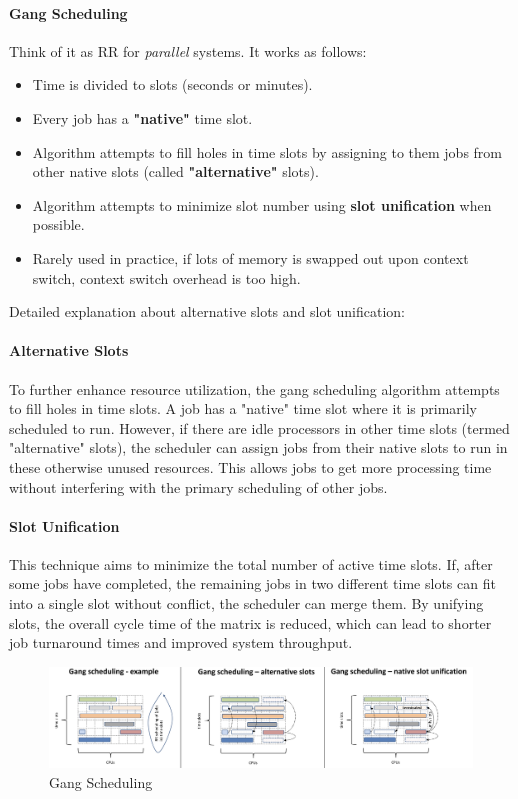 \documentclass[openany,12pt]{book}
\begin{document}
\paragraph{Gang Scheduling} Think of it as RR for \textit{parallel} systems. It works as follows:
\begin{itemize}
  \item Time is divided to slots (seconds or minutes).
  \item Every job has a \textbf{"native"} time slot.
  \item Algorithm attempts to fill holes in time slots by assigning to them jobs from other native slots (called \textbf{"alternative"} slots).
  \item Algorithm attempts to minimize slot number using \textbf{slot unification} when possible.
  \item Rarely used in practice, if lots of memory is swapped out upon context switch, context switch overhead is too high.
\end{itemize}
Detailed explanation about alternative slots and slot unification:

\paragraph{Alternative Slots} To further enhance resource utilization, the gang scheduling algorithm attempts to fill holes in time slots. A job has a "native" time slot where it is primarily scheduled to run. However, if there are idle processors in other time slots (termed "alternative" slots), the scheduler can assign jobs from their native slots to run in these otherwise unused resources. This allows jobs to get more processing time without interfering with the primary scheduling of other jobs.

\paragraph{Slot Unification}This technique aims to minimize the total number of active time slots. If, after some jobs have completed, the remaining jobs in two different time slots can fit into a single slot without conflict, the scheduler can merge them. By unifying slots, the overall cycle time of the matrix is reduced, which can lead to shorter job turnaround times and improved system throughput.

\begin{figure}[H]
  \centering
  \includegraphics[width=1\textwidth]{GangScheduling.png}
  \caption{Gang Scheduling}
  \label{fig:Gang_Scheduling}
\end{figure}
\end{document}
